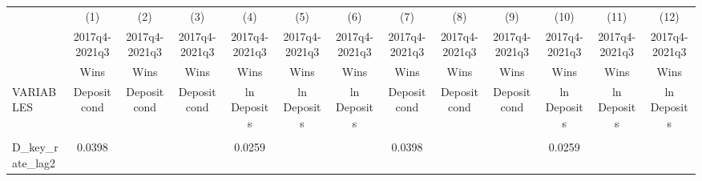 \documentclass[]{article}
\begin{document}
\begin{center}
\begin{tabular}{lcccccccccccc} \hline
 & (1) & (2) & (3) & (4) & (5) & (6) & (7) & (8) & (9) & (10) & (11) & (12) \\
 & 2017q4-2021q3 & 2017q4-2021q3 & 2017q4-2021q3 & 2017q4-2021q3 & 2017q4-2021q3 & 2017q4-2021q3 & 2017q4-2021q3 & 2017q4-2021q3 & 2017q4-2021q3 & 2017q4-2021q3 & 2017q4-2021q3 & 2017q4-2021q3 \\
 & Wins & Wins & Wins & Wins & Wins & Wins & Wins & Wins & Wins & Wins & Wins & Wins \\
VARIABLES & Deposit cond & Deposit cond & Deposit cond & ln Deposits & ln Deposits & ln Deposits & Deposit cond & Deposit cond & Deposit cond & ln Deposits & ln Deposits & ln Deposits \\ \hline
\vspace{4pt} & \begin{footnotesize}\end{footnotesize} & \begin{footnotesize}\end{footnotesize} & \begin{footnotesize}\end{footnotesize} & \begin{footnotesize}\end{footnotesize} & \begin{footnotesize}\end{footnotesize} & \begin{footnotesize}\end{footnotesize} & \begin{footnotesize}\end{footnotesize} & \begin{footnotesize}\end{footnotesize} & \begin{footnotesize}\end{footnotesize} & \begin{footnotesize}\end{footnotesize} & \begin{footnotesize}\end{footnotesize} & \begin{footnotesize}\end{footnotesize} \\
D\_key\_rate\_lag2 & 0.0398 &  &  & 0.0259 &  &  & 0.0398 &  &  & 0.0259 &  &  \\

\end{tabular}
\end{center}
\end{document}
